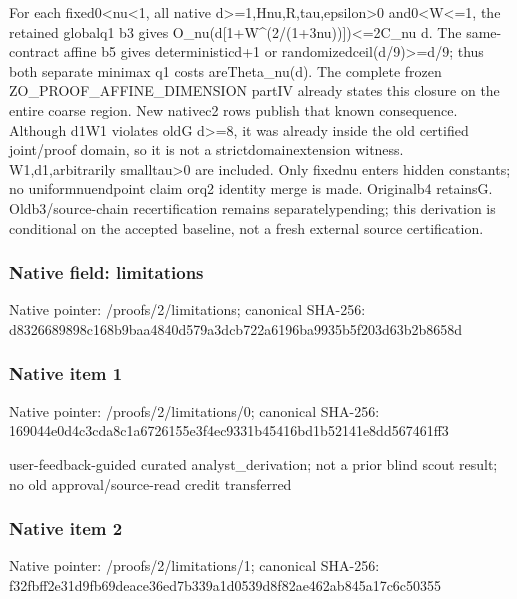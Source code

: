 \documentclass[10pt,a4paper]{article}
\begin{document}
\begingroup\raggedright\sloppy For each fixed0<nu<1,\allowbreak{} all native d>=\allowbreak{}1,\allowbreak{}Hnu,\allowbreak{}R,\allowbreak{}tau,\allowbreak{}epsilon>0 and0<W<=\allowbreak{}1,\allowbreak{} the retained globalq1 b3 gives O\_\allowbreak{}nu(d[1+W\textasciicircum{}(2/\allowbreak{}(1+3nu))])<=\allowbreak{}2C\_\allowbreak{}nu d. The same-contract affine b5 gives deterministicd+1 or randomizedceil(d/\allowbreak{}9)>=\allowbreak{}d/\allowbreak{}9;\allowbreak{} thus both separate minimax q1 costs areTheta\_\allowbreak{}nu(d). The complete frozen ZO\_\allowbreak{}PROOF\_\allowbreak{}AFFINE\_\allowbreak{}DIMENSION partIV already states this closure on the entire coarse region. New nativec2 rows publish that known consequence. Although d1W1 violates oldG d>=\allowbreak{}8,\allowbreak{} it was already inside the old certified joint/\allowbreak{}proof domain,\allowbreak{} so it is not a strictdomainextension witness. W1,\allowbreak{}d1,\allowbreak{}arbitrarily smalltau>0 are included. Only fixednu enters hidden constants;\allowbreak{} no uniformnuendpoint claim orq2 identity merge is made. Originalb4 retainsG. Oldb3/\allowbreak{}source-chain recertification remains separatelypending;\allowbreak{} this derivation is conditional on the accepted baseline,\allowbreak{} not a fresh external source certification.\par\endgroup

\subsubsection{Native field: limitations}
Native pointer: /proofs/2/limitations; canonical SHA-256: d8326689898c168b9baa4840d579a3dcb722a6196ba9935b5f203d63b2b8658d

\subsubsection{Native item 1}
Native pointer: /proofs/2/limitations/0; canonical SHA-256: 169044e0d4c3cda8c1a6726155e3f4ec9331b45416bd1b52141e8dd567461ff3

\begingroup\raggedright\sloppy user-feedback-guided curated analyst\_\allowbreak{}derivation;\allowbreak{} not a prior blind scout result;\allowbreak{} no old approval/\allowbreak{}source-read credit transferred\par\endgroup

\subsubsection{Native item 2}
Native pointer: /proofs/2/limitations/1; canonical SHA-256: f32fbff2e31d9fb69deace36ed7b339a1d0539d8f82ae462ab845a17c6c50355
\end{document}
